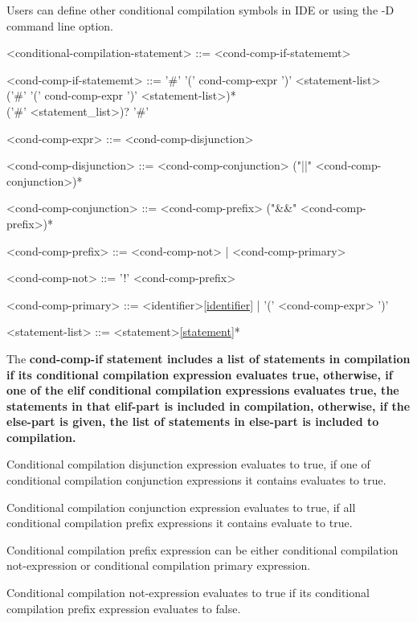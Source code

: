 \documentclass[a4paper,oneside,11pt]{article}
\begin{document}
Users can define other conditional compilation symbols in IDE or using the -D command line option.

\begin{grammar}
\label{conditional-compilation-statement}<conditional-compilation-statement> ::= <cond-comp-if-statememt>

<cond-comp-if-statememt> ::= '\#'  '(' cond-comp-expr ')' <statement-list>\\
('\#'  '(' cond-comp-expr ')' <statement-list>)*\\
('\#'  <statement_list>)? '\#' 

<cond-comp-expr> ::= <cond-comp-disjunction>

<cond-comp-disjunction> ::= <cond-comp-conjunction> ("||" <cond-comp-conjunction>)*

<cond-comp-conjunction> ::= <cond-comp-prefix> ("&&" <cond-comp-prefix>)*

<cond-comp-prefix> ::= <cond-comp-not> | <cond-comp-primary>

<cond-comp-not> ::= '!' <cond-comp-prefix>

<cond-comp-primary> ::= <identifier>\ref{identifier} | '(' <cond-comp-expr> ')'

<statement-list> ::= <statement>\ref{statement}*
\end{grammar}

The \bf{cond-comp-if} statement includes a list of statements in compilation
if its conditional compilation expression evaluates true,
otherwise, if one of the \bf{elif} conditional compilation expressions evaluates true,
the statements in that \bf{elif}-part is included in compilation, otherwise,
if the \bf{else}-part is given, the list of statements in \bf{else}-part is
included to compilation.

Conditional compilation disjunction expression evaluates to true,
if one of conditional compilation conjunction expressions it contains evaluates to true.

Conditional compilation conjunction expression evaluates to true,
if all conditional compilation prefix expressions it contains evaluate to true.

Conditional compilation prefix expression can be either conditional compilation not-expression
or conditional compilation primary expression.

Conditional compilation not-expression evaluates to true if its conditional compilation
prefix expression evaluates to false.
\end{document}
